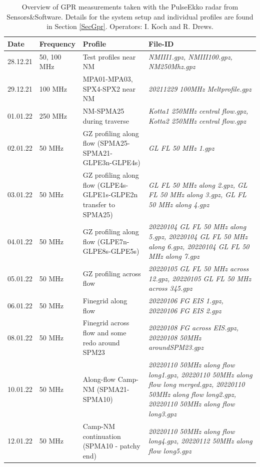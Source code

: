 \documentclass[a4paper,12pt]{article}
\begin{document}
\begin{table}
  \begin{tabular}{m{1cm} m{1 cm} m{5cm} m{8cm}}
    \rowcolor{gray!50}
    Date & Frequency & Profile & File-ID\\
    \hline
    28.12.21 & 50, 100 MHz & Test profiles near NM& \textit{NMIII1.gpz, NMIII100.gpz, NM250Mhz.gpz}\\
    29.12.21 & 100 MHz & MPA01-MPA03, SPX4-SPX2 near NM& \textit{20211229 100MHz Meltprofile.gpz}\\
    01.01.22 & 250 MHz  & NM-SPMA25 during traverse& \textit{Kotta1 250MHz central flow.gpz, Kotta2 250MHz central flow.gpz}\\
    02.01.22 & 50 MHz & GZ profiling along flow (SPMA25-SPMA21-GLPE3n-GLPE4s)& \textit{GL FL 50 MHz 1.gpz}\\
    03.01.22 & 50 MHz & GZ profiling along flow (GLPE4s-GLPE1s-GLPE2n transfer to SPMA25)& \textit{GL FL 50 MHz along 2.gpz, GL FL 50 MHz along 3.gpz, GL FL 50 MHz along 4.gpz}\\
    04.01.22 & 50 MHz & GZ profiling along flow (GLPE7n-GLPE8s-GLPE5s)& \textit{20220104 GL FL 50 MHz along 5.gpz, 20220104 GL FL 50 MHz along 6.gpz, 20220104 GL FL 50 MHz along 7.gpz}\\
    05.01.22 & 50 MHz & GZ profiling across flow & \textit{20220105 GL FL 50 MHz across 12.gpz, 20220105 GL FL 50 MHz across 345.gpz}\\
    06.01.22 & 50 MHz & Finegrid along flow & \textit{20220106 FG EIS 1.gpz, 20220106 FG EIS 2.gpz}\\
    08.01.22 & 50 MHz & Finegrid across flow and some redo around SPM23 & \textit{20220108 FG across EIS.gpz, 20220108 50MHz aroundSPM23.gpz}\\
    10.01.22 & 50 MHz & Along-flow Camp-NM (SPMA21-SPMA10)& \textit{20220110 50MHz along flow long1.gpz, 20220110 50MHz along flow long merged.gpz, 20220110 50MHz along flow long2.gpz, 20220110 50MHz along flow long3.gpz}\\
    12.01.22 & 50 MHz & Camp-NM continuation (SPMA10 - patchy end)& \textit{20220110 50MHz along flow long4.gpz, 20220112 50MHz along flow long5.gpz}\\
    \hline
  \end{tabular}
  \caption{\label{TableGPR}Overview of GPR measurements taken with the PulseEkko radar from Sensors\&Software. Details for the system setup and individual profiles are found in Section \ref{SecGpr}. Operators: I. Koch and R. Drews.}
\end{table}
\pagebreak
\end{document}
